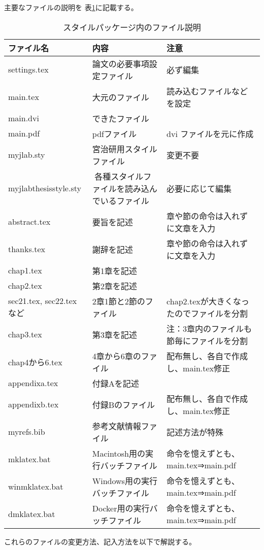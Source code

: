 主要なファイルの説明を 表\ref{table:files2}に記載する。
\begin{table}[H]
\begin{center}
\caption{スタイルパッケージ内のファイル説明}
\vspace{-2mm}
{\footnotesize
\begin{tabular}{|l|l|l|}
\hline
ファイル名 & 内容 & 注意\\\hline\hline
settings.tex & 論文の必要事項設定ファイル & 必ず編集\\\hline
main.tex & 大元のファイル & 読み込むファイルなどを設定\\\hline
main.dvi & できたファイル & \\\hline
main.pdf & pdfファイル & dvi ファイルを元に作成\\\hline
myjlab.sty & 宮治研用スタイルファイル & 変更不要\\\hline
myjlabthesisstyle.sty & 各種スタイルファイルを読み込んでいるファイル & 必要に応じて編集\\\hline
abstract.tex & 要旨を記述 & 章や節の命令は入れずに文章を入力\\\hline
thanks.tex & 謝辞を記述 & 章や節の命令は入れずに文章を入力\\\hline
chap1.tex & 第1章を記述 & \\\hline
chap2.tex & 第2章を記述 & \\\hline
sec21.tex, sec22.tex など& 2章1節と2節のファイル & chap2.texが大きくなったのでファイルを分割\\\hline
chap3.tex & 第3章を記述 & 注：3章内のファイルも節毎にファイルを分割\\\hline
chap4から6.tex & 4章から6章のファイル & 配布無し、各自で作成し、main.tex修正\\\hline
appendixa.tex & 付録Aを記述 & \\\hline
appendixb.tex & 付録Bのファイル & 配布無し、各自で作成し、main.tex修正\\\hline
myrefs.bib & 参考文献情報ファイル & 記述方法が特殊\\\hline
mklatex.bat & Macintosh用の実行バッチファイル & 命令を憶えずとも、main.tex⇒main.pdf\\\hline
winmklatex.bat & Windows用の実行バッチファイル & 命令を憶えずとも、
main.tex⇒main.pdf\\\hline
dmklatex.bat & Docker用の実行バッチファイル & 命令を憶えずとも、
main.tex⇒main.pdf\\\hline
\end{tabular}
}
\label{table:files2}
\end{center}
\end{table}

これらのファイルの変更方法、記入方法を以下で解説する。
